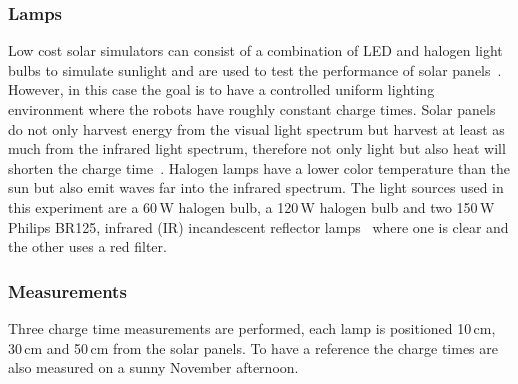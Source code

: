 \begin{table}[t]
	\centering
	\caption{Specification of the three solar panels tested in the experiment.}
	\label{tab:solar_panels}
\end{table}


\subsubsection{Lamps}
Low cost solar simulators can consist of a combination of LED and halogen light bulbs to simulate sunlight and are used to test the performance of solar panels~\cite{grandi_tia_2014}.
However, in this case the goal is to have a controlled uniform lighting environment where the robots have roughly constant charge times.
Solar panels do not only harvest energy from the visual light spectrum but harvest at least as much from the infrared light spectrum, therefore not only light but also heat will shorten the charge time~\cite{ixolar_slmd121h04l_2017}.
Halogen lamps have a lower color temperature than the sun but also emit waves far into the infrared spectrum.
The light sources used in this experiment are a 60\,W halogen bulb, a 120\,W halogen bulb and two 150\,W Philips  BR125, infrared (IR) incandescent reflector lamps~\cite{philips_irlamp_2017} where one is clear and the other uses a red filter.

\subsubsection{Measurements}
Three charge time measurements are performed, each lamp is positioned 10\,cm, 30\,cm and 50\,cm from the solar panels.
To have a reference the charge times are also measured on a sunny November afternoon. 

